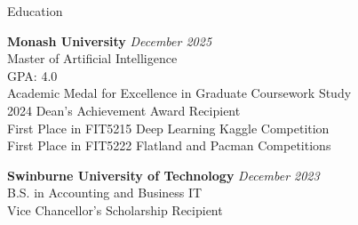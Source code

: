 \documentclass[
	10pt, %
]{resume} %
\begin{document}

\begin{rSection}{Education}

	\textbf{Monash University} \hfill \textit{December 2025} \\
	Master of Artificial Intelligence \\
	GPA: 4.0 \\
    Academic Medal for Excellence in Graduate Coursework Study \\
    2024 Dean's Achievement Award Recipient \\
	First Place in FIT5215 Deep Learning Kaggle Competition \\
    First Place in FIT5222 Flatland and Pacman Competitions

	\textbf{Swinburne University of Technology} \hfill \textit{December 2023} \\
	B.S. in Accounting and Business IT \\
	Vice Chancellor's Scholarship Recipient

\end{rSection}

\end{document}
